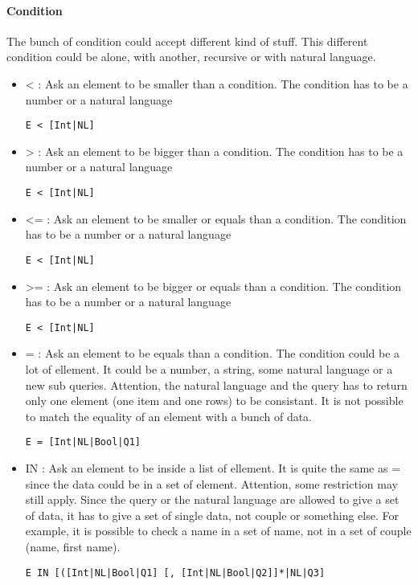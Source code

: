 \documentclass{article}
\begin{document}
\paragraph{Condition}
The bunch of condition could accept different kind of stuff. This different condition could be alone, with another, recursive or with natural language.
\begin{itemize}
\item < : Ask an element to be smaller than a condition. The condition has to be a number or a natural language
\begin{verbatim}
E < [Int|NL]
\end{verbatim}
\item > : Ask an element to be bigger than a condition. The condition has to be a number or a natural language
\begin{verbatim}
E < [Int|NL]
\end{verbatim}
\item <= : Ask an element to be smaller or equals than a condition. The condition has to be a number or a natural language
\begin{verbatim}
E < [Int|NL]
\end{verbatim}
\item >= : Ask an element to be bigger or equals than a condition. The condition has to be a number or a natural language
\begin{verbatim}
E < [Int|NL]
\end{verbatim}
\item = : Ask an element to be equals than a condition. The condition could be a lot of ellement. It could be a number, a string, some natural language or a new sub queries. Attention, the natural language and the query has to return only one element (one item and one rows) to be consistant. It is not possible to match the equality of an element with a bunch of data.
\begin{verbatim}
E = [Int|NL|Bool|Q1]
\end{verbatim}
\item IN : Ask an element to be inside a list of ellement. It is quite the same as = since the data could be in a set of element. Attention, some restriction may still apply. Since the query or the natural language are allowed to give a set of data, it has to give a set of single data, not couple or something else. For example, it is possible to check a name in a set of name, not in a set of couple (name, first name).
\begin{verbatim}
E IN [([Int|NL|Bool|Q1] [, [Int|NL|Bool|Q2]]*|NL|Q3]

\end{verbatim}
\end{itemize}
\end{document}
